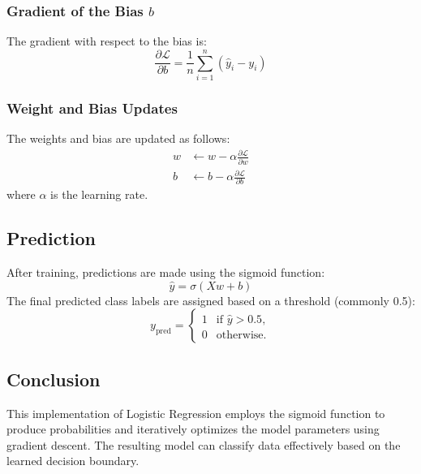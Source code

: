 \documentclass{article}
\begin{document}
\subsubsection*{Gradient of the Bias \( b \)}
The gradient with respect to the bias is:
\[
\frac{\partial \mathcal{L}}{\partial b} = \frac{1}{n} \sum_{i=1}^n (\hat{y}_i - y_i)
\]

\subsubsection*{Weight and Bias Updates}
The weights and bias are updated as follows:
\[
\begin{aligned}
    w &\leftarrow w - \alpha \frac{\partial \mathcal{L}}{\partial w} \\
    b &\leftarrow b - \alpha \frac{\partial \mathcal{L}}{\partial b}
\end{aligned}
\]
where \( \alpha \) is the learning rate.

\subsection*{Prediction}
After training, predictions are made using the sigmoid function:
\[
\hat{y} = \sigma(Xw + b)
\]
The final predicted class labels are assigned based on a threshold (commonly 0.5):
\[
y_\text{pred} = \begin{cases} 
    1 & \text{if } \hat{y} > 0.5, \\
    0 & \text{otherwise.}
\end{cases}
\]

\subsection*{Conclusion}
This implementation of Logistic Regression employs the sigmoid function to produce probabilities and iteratively optimizes the model parameters using gradient descent. The resulting model can classify data effectively based on the learned decision boundary.
\end{document}
